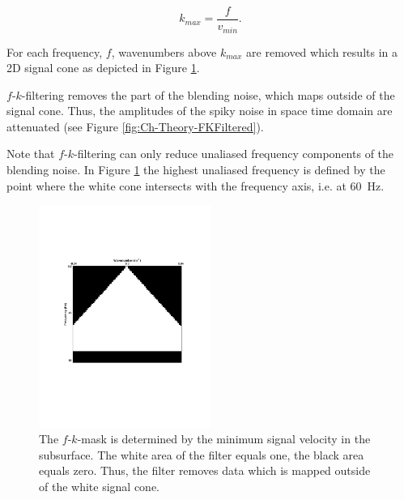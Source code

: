 \begin{equation}
	k_{max} = \frac{f}{v_{min}}.
	\label{eq_Ch-Theory-MaxWavenmber}
\end{equation} 

For each frequency, $f$, wavenumbers above $k_{max}$ are removed which results in a 2D signal cone as depicted in Figure \ref{fig:Ch-Theory-FK-Mask}.

$f$-$k$-filtering removes the part of the blending noise, which maps outside of the signal cone. Thus, the amplitudes of the spiky noise in space time domain are attenuated (see Figure \ref{fig:Ch-Theory-FKFiltered}). 

Note that $f$-$k$-filtering can only reduce unaliased frequency components of the blending noise. In Figure \ref{fig:Ch-Theory-FK-Mask} the highest unaliased frequency is defined by the point where the white cone intersects with the frequency axis, i.e. at \SI{60}{\hertz}.

\begin{figure}
	\centering
	\includegraphics[width = 0.5\textwidth]{Plots/Mahdad/5iter/FK-MaskCRG_rec30}
	\caption{The $f$-$k$-mask is determined by the minimum signal velocity in the subsurface. The white area of the filter equals one, the black area equals zero. Thus, the filter removes data which is mapped outside of the white signal cone.}
	\label{fig:Ch-Theory-FK-Mask}
\end{figure}

 


